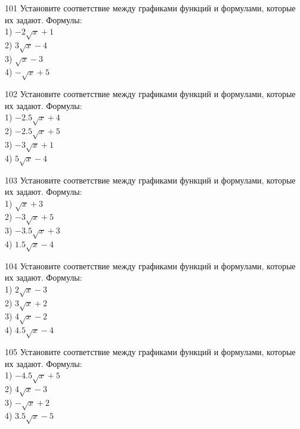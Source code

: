 \documentclass[4apaper]{article}
\begin{document}
\begin{taskBN}{101}
Установите соответствие между графиками функций и формулами, которые их задают. Формулы: \\1) $-2\sqrt{x}+1$\\2) $3\sqrt{x}-4$\\3) $\sqrt{x}-3$\\4) $-\sqrt{x}+5$
\end{taskBN}

\begin{taskBN}{102}
Установите соответствие между графиками функций и формулами, которые их задают. Формулы: \\1) $-2.5\sqrt{x}+4$\\2) $-2.5\sqrt{x}+5$\\3) $-3\sqrt{x}+1$\\4) $5\sqrt{x}-4$
\end{taskBN}

\begin{taskBN}{103}
Установите соответствие между графиками функций и формулами, которые их задают. Формулы: \\1) $\sqrt{x}+3$\\2) $-3\sqrt{x}+5$\\3) $-3.5\sqrt{x}+3$\\4) $1.5\sqrt{x}-4$
\end{taskBN}

\begin{taskBN}{104}
Установите соответствие между графиками функций и формулами, которые их задают. Формулы: \\1) $2\sqrt{x}-3$\\2) $3\sqrt{x}+2$\\3) $4\sqrt{x}-2$\\4) $4.5\sqrt{x}-4$
\end{taskBN}

\begin{taskBN}{105}
Установите соответствие между графиками функций и формулами, которые их задают. Формулы: \\1) $-4.5\sqrt{x}+5$\\2) $4\sqrt{x}-3$\\3) $-\sqrt{x}+2$\\4) $3.5\sqrt{x}-5$
\end{taskBN}
\end{document}
